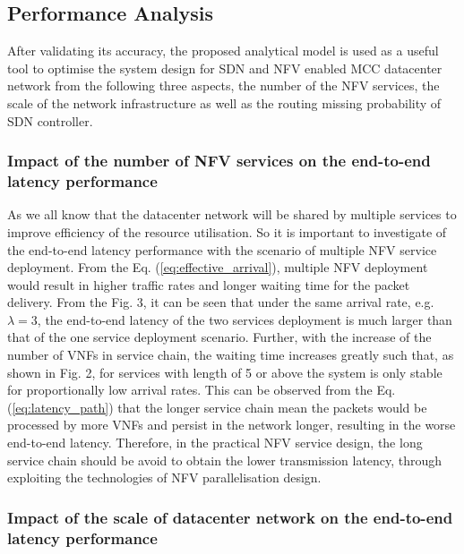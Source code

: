 	\subsection{Performance Analysis}
	After validating its accuracy, the proposed analytical model is used as a useful tool to optimise the system design for SDN and NFV enabled MCC datacenter network from the following three aspects, the number of the NFV services, the scale of the network infrastructure as well as the routing missing probability of SDN controller.
	
	\subsubsection{Impact of the number of NFV services on the end-to-end latency performance}
	
	As we all know that the datacenter network will be shared by multiple services to improve efficiency of the resource utilisation. So it is important to investigate of the end-to-end latency performance with the scenario of multiple NFV service deployment. From the Eq. (\ref{eq:effective_arrival}), multiple NFV deployment would result in higher traffic rates and longer waiting time for the packet delivery. From the Fig. 3, it can be seen that under the same arrival rate, e.g. $\lambda=3$, the end-to-end latency of the two services deployment is much larger than that of the one service deployment scenario. Further, with the increase of the number of VNFs in service chain, the waiting time increases greatly such that, as shown in Fig. 2, for services with length of 5 or above the system is only stable for proportionally low arrival rates. This can be observed from the Eq. (\ref{eq:latency_path}) that the longer service chain mean the packets would be processed by more VNFs and persist in the network longer, resulting in the worse end-to-end latency. Therefore, in the practical NFV service design, the long service chain should be avoid to obtain the lower transmission latency, through exploiting the technologies of NFV parallelisation design. 
	
	\subsubsection{Impact of the scale of datacenter network on the end-to-end latency performance}
	
